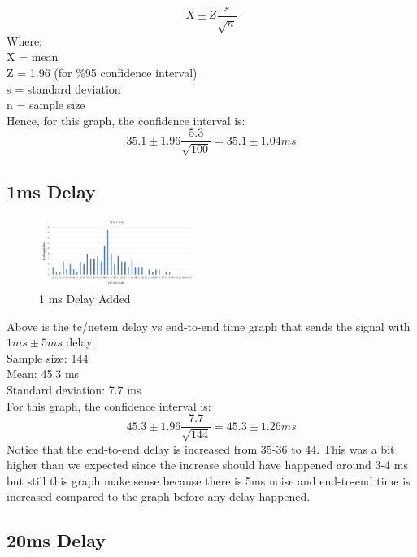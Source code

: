 \documentclass[conference]{IEEEtran}
\begin{document}
$$X \pm Z \dfrac{s}{\sqrt{n}}$$
Where; \\
X = mean \\
Z = 1.96 (for \%95 confidence interval) \\
s = standard deviation \\
n = sample size \\
Hence, for this graph, the confidence interval is:
$$35.1 \pm 1.96 \dfrac{5.3}{\sqrt{100}} = 35.1 \pm 1.04ms$$

\subsection{1ms Delay}

\begin{figure}[h]
\includegraphics[width=0.45\textwidth]{1_ms.png}
\caption{1 ms Delay Added}
\label{fig:figure2}
\end{figure}
Above is the tc/netem delay vs end-to-end time graph that sends the signal with $1ms \pm 5ms$ delay. \\
Sample size: 144 \\
Mean: 45.3 ms \\
Standard deviation: 7.7 ms \\
For this graph, the confidence interval is:
$$45.3 \pm 1.96 \dfrac{7.7}{\sqrt{144}} = 45.3 \pm 1.26ms $$
Notice that the end-to-end delay is increased from 35-36 to 44. This was a bit higher than we expected since the increase should have happened around 3-4 ms but still this graph make sense because there is 5ms noise and  end-to-end time is increased compared to the graph before any delay happened.

\subsection{20ms Delay}
\end{document}
